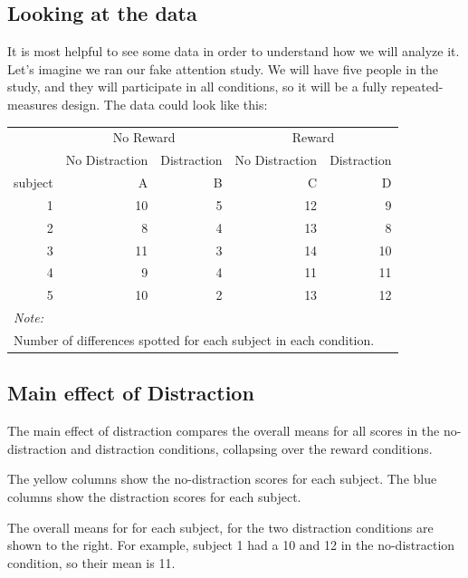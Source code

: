 \documentclass[
]{book}
\begin{document}
\subsection{Looking at the data}\label{looking-at-the-data}

It is most helpful to see some data in order to understand how we will analyze it. Let's imagine we ran our fake attention study. We will have five people in the study, and they will participate in all conditions, so it will be a fully repeated-measures design. The data could look like this:

\begin{tabular}{r|r|r|r|r}
\hline
\multicolumn{1}{c|}{ } & \multicolumn{2}{c|}{No Reward} & \multicolumn{2}{c}{Reward} \\
\cline{2-3} \cline{4-5}
\multicolumn{1}{c|}{ } & \multicolumn{1}{c|}{No Distraction} & \multicolumn{1}{c|}{Distraction} & \multicolumn{1}{c|}{No Distraction} & \multicolumn{1}{c}{Distraction} \\
\cline{2-2} \cline{3-3} \cline{4-4} \cline{5-5}
subject & A & B & C & D\\
\hline
1 & 10 & 5 & 12 & 9\\
\hline
2 & 8 & 4 & 13 & 8\\
\hline
3 & 11 & 3 & 14 & 10\\
\hline
4 & 9 & 4 & 11 & 11\\
\hline
5 & 10 & 2 & 13 & 12\\
\hline
\multicolumn{5}{l}{\rule{0pt}{1em}\textit{Note: }}\\
\multicolumn{5}{l}{\rule{0pt}{1em}Number of differences spotted for each subject in each condition. }\\
\end{tabular}

\subsection{Main effect of Distraction}\label{main-effect-of-distraction}

The main effect of distraction compares the overall means for all scores in the no-distraction and distraction conditions, collapsing over the reward conditions.

The yellow columns show the no-distraction scores for each subject. The blue columns show the distraction scores for each subject.

The overall means for for each subject, for the two distraction conditions are shown to the right. For example, subject 1 had a 10 and 12 in the no-distraction condition, so their mean is 11.
\end{document}
